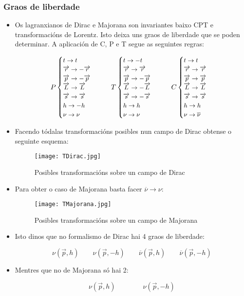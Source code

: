 \documentclass[10pt]{beamer}
\newcommand{\beq}{\begin{equation}}
\newcommand{\eeq}{\end{equation}}
\newcommand{\bi}{\begin{itemize}}
\newcommand{\ei}{\end{itemize}}
\newcommand{\bc}{\begin{cases}}
\newcommand{\ec}{\end{cases}}
\newcommand{\barra}[1]{\overline{#1}}
\newcommand{\rvec}[1]{\overrightarrow{#1}}
\begin{document}
\begin{frame}[allowframebreaks] \frametitle{Graos de liberdade}
\bi

\item Os lagranxianos de Dirac e Majorana son invariantes baixo CPT e transformacións de Lorentz. Isto deixa uns graos de liberdade que se poden determinar. A aplicación de C, P e T segue as seguintes regras:

\beq \small
P\bc t \rightarrow t \\ \rvec r \rightarrow -\rvec r \\  \rvec p \rightarrow -\rvec p \\  \rvec L \rightarrow \rvec L \\  \rvec s \rightarrow \rvec s \\ h \rightarrow -h \\  \nu \rightarrow \nu \ec \qquad
T\bc t \rightarrow -t \\ \rvec r \rightarrow \rvec r \\  \rvec p \rightarrow -\rvec p \\  \rvec L \rightarrow -\rvec L \\  \rvec s \rightarrow -\rvec s \\ h \rightarrow h \\  \nu \rightarrow \nu \ec \qquad
C\bc t \rightarrow t \\ \rvec r \rightarrow \rvec r \\  \rvec p \rightarrow \rvec p \\  \rvec L \rightarrow \rvec L \\  \rvec s \rightarrow \rvec s \\ h \rightarrow h \\  \nu \rightarrow \barra\nu \ec \nonumber
\eeq

\item Facendo tódalas transformacións posibles nun campo de Dirac obtense o seguinte esquema:

\begin{figure}[h!]
	\centering
		\texttt{[image: TDirac.jpg]}
	\caption{ Posibles transformacións sobre un campo de Dirac}
\end{figure}

\item Para obter o caso de Majorana basta facer $\barra\nu \rightarrow \nu$:

\begin{figure}[h!]
	\centering
		\texttt{[image: TMajorana.jpg]}
	\caption{ Posibles transformacións sobre un campo de Majorana}
\end{figure}

\item Isto dinos que no formalismo de Dirac hai 4 graos de liberdade:

\beq
\nu (\rvec p , h) \qquad \nu (\rvec p , -h) \qquad \barra\nu (\rvec p , h) \qquad \barra\nu (\rvec p , -h) \nonumber
\eeq

\item Mentres que no de Majorana só hai 2:

\beq
\nu ( \rvec p , h) \qquad \qquad \nu ( \rvec p , -h ) \nonumber
\eeq

\ei
\end{frame}
\end{document}
